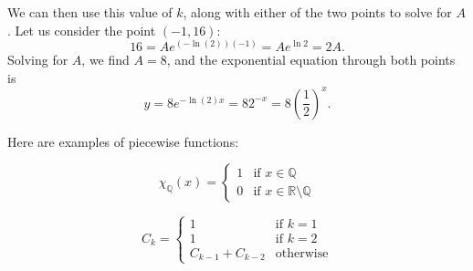 \documentclass[10pt]{article}         %
\begin{document}
We can then use this value of $k$, along with either of the two points to
solve for $A$.  Let us consider the point $(-1, 16)$:
$$
	16 = A e^{(-\ln(2))(-1)} = A e^{\ln{2}} = 2 A
	.
$$
Solving for $A$, we find $A = 8$, and the exponential equation through both
points is
$$
	y
	= 8 e^{-\ln(2) x}
	= 8 2^{-x}
	= 8 \left( \frac{1}{2} \right)^x
	.
$$

Here are examples of piecewise functions:

\begin{equation}
\chi_{\mathbb{Q}}(x)=
    \begin{cases}
        1 & \text{if } x \in \mathbb{Q}\\
        0 & \text{if } x \in \mathbb{R}\setminus\mathbb{Q}
    \end{cases}
\end{equation}

\begin{equation}
    C_{k} =
    \begin{cases}
        1 & \text{if } k = 1\\
        1 & \text{if } k = 2\\
        C_{k-1} + C_{k-2} & \text{otherwise}
    \end{cases}
\end{equation}
\end{document}

